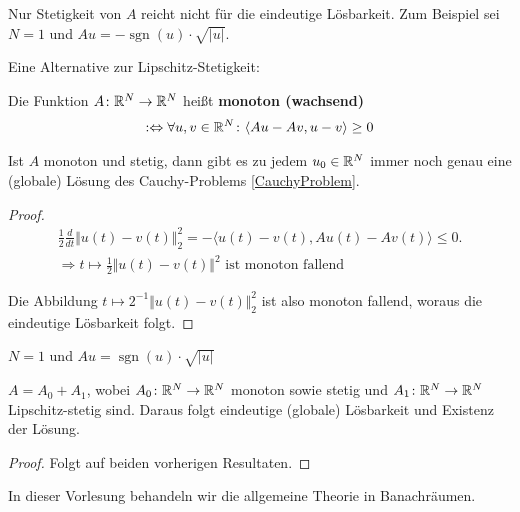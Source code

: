 \begin{bemerkung}
Nur Stetigkeit von $A$ reicht nicht für die eindeutige Lösbarkeit. Zum Beispiel sei $N=1$ und $Au=-\operatorname{sgn}(u)\cdot\sqrt{\vert u\vert}$.
\end{bemerkung}

Eine Alternative zur Lipschitz-Stetigkeit:

\begin{definition}[Monotonie]
Die Funktion $A\colon\mathbb{R}^N\to\mathbb{R}^N$ heißt \textbf{monoton (wachsend)}
\begin{align*}
:\Leftrightarrow\forall u,v\in\mathbb{R}^N\colon\langle Au-Av,u-v\rangle\geq 0
\end{align*}
\end{definition}

\begin{lemma}
Ist $A$ monoton und stetig, dann gibt es zu jedem $u_0\in\mathbb{R}^N$ immer noch genau eine (globale) Lösung des Cauchy-Problems \eqref{CauchyProblem}.
\end{lemma}
\begin{proof}
\begin{align*}
	\frac{1}{2}\frac{d}{dt}\Vert u(t)-v(t)\Vert_2^2=-\langle u(t)-v(t),Au(t)-Av(t)\rangle\leq 0.\\
	\Longrightarrow t\mapsto\frac{1}{2}\Vert u(t)-v(t)\Vert^2\text{ ist monoton fallend}
\end{align*}

Die Abbildung $t\mapsto 2^{-1}\Vert u(t)-v(t)\Vert_2^2$ ist also monoton fallend, woraus die eindeutige Lösbarkeit folgt. 
\end{proof}

\begin{beispiel}
$N=1$ und $Au=\operatorname{sgn}(u)\cdot\sqrt{\vert u\vert}$
\end{beispiel}

\begin{korollar}
$A=A_0+A_1$, wobei $A_0\colon\mathbb{R}^N\to\mathbb{R}^N$ monoton sowie stetig und $A_1\colon\mathbb{R}^N\to\mathbb{R}^N$ Lipschitz-stetig sind. Daraus folgt eindeutige (globale) Lösbarkeit und Existenz der Lösung.
\end{korollar}
\begin{proof}
Folgt auf beiden vorherigen Resultaten.
\end{proof}

In dieser Vorlesung behandeln wir die allgemeine Theorie in Banachräumen.
